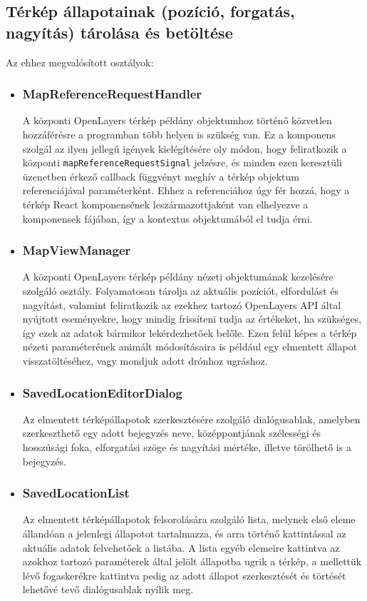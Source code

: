 \subsection{Térkép állapotainak (pozíció, forgatás, nagyítás) tárolása és betöltése}

\noindent Az ehhez megvalósított osztályok:
\begin{itemize}

\item\subsubsection{MapReferenceRequestHandler}
A központi OpenLayers térkép példány objektumhoz történő közvetlen hozzáférésre
a programban több helyen is szükség van. Ez a komponens szolgál az ilyen jellegű
igények kielégítésére oly módon, hogy feliratkozik a központi
\verb|mapReferenceRequestSignal| jelzésre, és minden ezen keresztüli üzenetben
érkező callback függvényt meghív a térkép objektum referenciájával
paraméterként. Ehhez a referenciához úgy fér hozzá, hogy a térkép React
komponensének leszármazottjaként van elhelyezve a komponensek fájában, így a
kontextus objektumából el tudja érni.

\item\subsubsection{MapViewManager}
A központi OpenLayers térkép példány nézeti objektumának kezelésére szolgáló
osztály. Folyamatosan tárolja az aktuális pozíciót, elfordulást és nagyítást,
valamint feliratkozik az ezekhez tartozó OpenLayers API által nyújtott
eseményekre, hogy mindig frissíteni tudja az értékeket, ha szükséges, így ezek
az adatok bármikor lekérdezhetőek belőle. Ezen felül képes a térkép nézeti
paraméterének animált módosításaira is például egy elmentett állapot
visszatöltéséhez, vagy mondjuk adott drónhoz ugráshoz.

\item\subsubsection{SavedLocationEditorDialog}
Az elmentett térképállapotok szerkesztésére szolgáló dialógusablak, amelyben
szerkeszthető egy adott bejegyzés neve, középpontjának szélességi és hosszúsági
foka, elforgatási szöge és nagyítási mértéke, illetve törölhető is a bejegyzés.

\item\subsubsection{SavedLocationList}
Az elmentett térképállapotok felsorolására szolgáló lista, melynek első eleme
állandóan a jelenlegi állapotot tartalmazza, és arra történő kattintással az
aktuális adatok felvehetőek a listába. A lista egyéb elemeire kattintva az
azokhoz tartozó paraméterek által jelölt állapotba ugrik a térkép, a mellettük
lévő fogaskerékre kattintva pedig az adott állapot szerkesztését és törtését
lehetővé tevő dialógusablak nyílik meg.

\end{itemize}
